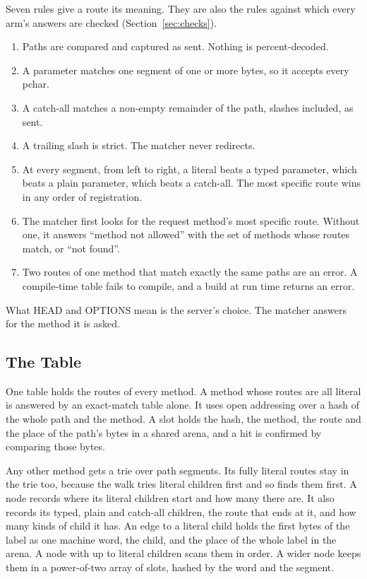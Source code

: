 Seven rules give a route its meaning. They are also the rules against which every arm's answers
are checked (Section~\ref{sec:checks}).
\begin{enumerate}
\item Paths are compared and captured as sent. Nothing is percent-decoded.
\item A parameter matches one segment of one or more bytes, so it accepts every pchar.
\item A catch-all matches a non-empty remainder of the path, slashes included, as sent.
\item A trailing slash is strict. The matcher never redirects.
\item At every segment, from left to right, a literal beats a typed parameter, which beats a plain
parameter, which beats a catch-all. The most specific route wins in any order of registration.
\item The matcher first looks for the request method's most specific route. Without one, it
answers ``method not allowed'' with the set of methods whose routes match, or ``not found''.
\item Two routes of one method that match exactly the same paths are an error. A compile-time
table fails to compile, and a build at run time returns an error.
\end{enumerate}
What HEAD and OPTIONS mean is the server's choice. The matcher answers for the method it is asked.

\subsection{The Table}\label{sec:table}

One table holds the routes of every method. A method whose routes are all literal is answered by an
exact-match table alone. It uses open addressing over a hash of the whole path and the method.
A slot holds the hash, the method, the route and the place of the path's bytes in a shared arena,
and a hit is confirmed by comparing those bytes.

Any other method gets a trie over path segments. Its fully literal routes stay in the trie too,
because the walk tries literal children first and so finds them first. A node records where its
literal children start and how many there are. It also records its typed, plain and catch-all
children, the route that ends at it, and how many kinds of child it has. An edge to a literal child
holds the first \KeyBytes{} bytes of the label as one machine word, the child, and the place of the
whole label in the arena. A node with up to \VTwoLinearEdges{} literal children scans them in order.
A wider node keeps them in a power-of-two array of slots, hashed by the word and the segment.

